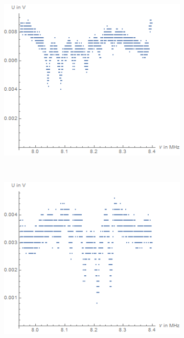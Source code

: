 \documentclass[bigchapter,colorback,accentcolor=tud4b,linedtoc,11pt]{tudreport}
\begin{document}
\begin{figure}[H]
    \centering
    \begin{subfigure}[H]{0.44\textwidth}
        \includegraphics[width=1\textwidth]{img/2-1-plot3.png}
    \end{subfigure}%
    \qquad
    ~%
    \begin{subfigure}[H]{0.44\textwidth}
        \includegraphics[width=1\textwidth]{img/2-1-plot4.png}
    \end{subfigure}
\end{figure}
\end{document}
